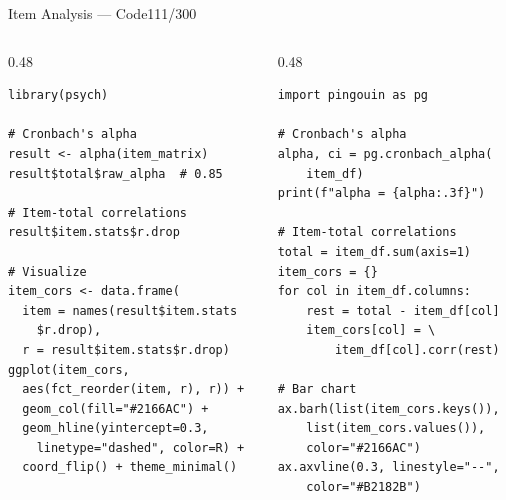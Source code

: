 \documentclass[10pt]{beamer}
\newcommand{\smark}[1]{\hfill{\scriptsize\color{codegray}#1}}
\begin{document}
\begin{frame}[fragile]{Item Analysis --- Code}\smark{111/300}
\begin{columns}[T]
\begin{column}{0.48\textwidth}
\begin{lstlisting}[style=Rstyle]
library(psych)

# Cronbach's alpha
result <- alpha(item_matrix)
result$total$raw_alpha  # 0.85

# Item-total correlations
result$item.stats$r.drop

# Visualize
item_cors <- data.frame(
  item = names(result$item.stats
    $r.drop),
  r = result$item.stats$r.drop)
ggplot(item_cors,
  aes(fct_reorder(item, r), r)) +
  geom_col(fill="#2166AC") +
  geom_hline(yintercept=0.3,
    linetype="dashed", color=R) +
  coord_flip() + theme_minimal()
\end{lstlisting}
\end{column}
\begin{column}{0.48\textwidth}
\begin{lstlisting}[style=Pystyle]
import pingouin as pg

# Cronbach's alpha
alpha, ci = pg.cronbach_alpha(
    item_df)
print(f"alpha = {alpha:.3f}")

# Item-total correlations
total = item_df.sum(axis=1)
item_cors = {}
for col in item_df.columns:
    rest = total - item_df[col]
    item_cors[col] = \
        item_df[col].corr(rest)

# Bar chart
ax.barh(list(item_cors.keys()),
    list(item_cors.values()),
    color="#2166AC")
ax.axvline(0.3, linestyle="--",
    color="#B2182B")
\end{lstlisting}
\end{column}
\end{columns}
\end{frame}
\end{document}
